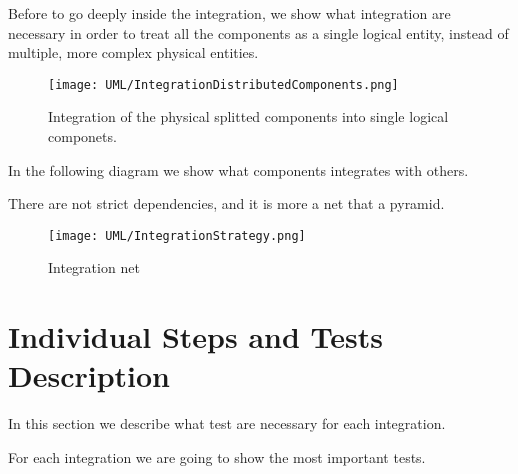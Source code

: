 \documentclass[11pt]{article} %
\begin{document}
Before to go deeply inside the integration, we show what integration are necessary in order to treat all the components as a single logical entity, instead of multiple, more complex physical entities.

\begin{figure}[H]
	\centering
	\texttt{[image: UML/IntegrationDistributedComponents.png]}
	\caption{Integration of the physical splitted components into single logical componets.}
\end{figure}	

In the following diagram we show what components integrates with others.

There are not strict dependencies, and it is more a net that a pyramid.

\begin{figure}[H]
	\centering
	\texttt{[image: UML/IntegrationStrategy.png]}
	\caption{Integration net}
\end{figure}	


\newpage
\section{Individual Steps and Tests Description}

In this section we describe what test are necessary for each integration.

For each integration we are going to show the most important tests.
\end{document}
